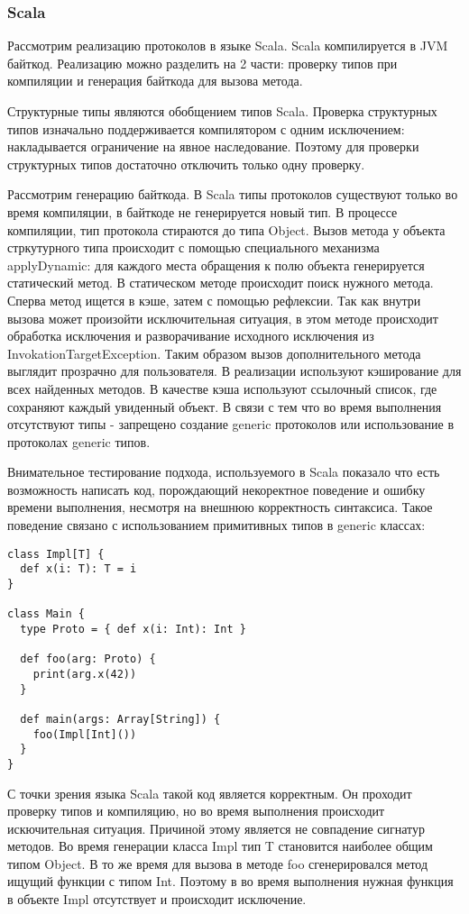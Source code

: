 \subsubsection{Scala}
Рассмотрим реализацию протоколов в языке Scala\cite{scala:structural}. Scala компилируется в JVM байткод. Реализацию можно разделить на 2 части: проверку типов при компиляции и генерация байткода для вызова метода.

Структурные типы являются обобщением типов Scala. Проверка структурных типов изначально поддерживается компилятором с одним исключением: накладывается ограничение на явное наследование. Поэтому для проверки структурных типов достаточно отключить только одну проверку.

Рассмотрим генерацию байткода. В Scala типы протоколов существуют только во время компиляции, в байткоде не генерируется новый тип. В процессе компиляции, тип протокола стираются до типа Object. Вызов метода у объекта стркутурного типа происходит с помощью специального механизма applyDynamic: для каждого места обращения к полю объекта генерируется статический метод. В статическом методе происходит поиск нужного метода. Сперва метод ищется в кэше, затем с помощью рефлексии. Так как внутри вызова может произойти исключительная ситуация, в этом методе происходит обработка исключения и разворачивание исходного исключения из InvokationTargetException. Таким образом вызов дополнительного метода выглядит прозрачно для пользователя. В реализации используют кэширование для всех найденных методов. В качестве кэша используют ссылочный список, где сохраняют каждый увиденный объект. В связи с тем что во время выполнения отсутствуют типы - запрещено создание generic протоколов или использование в протоколах generic типов.

Внимательное тестирование подхода, используемого в Scala показало что есть возможность написать код, порождающий некоректное поведение и ошибку времени выполнения, несмотря на внешнюю корректность синтаксиса. Такое поведение связано с использованием примитивных типов в generic классах:

\begin{verbatim}
class Impl[T] {
  def x(i: T): T = i
}

class Main {
  type Proto = { def x(i: Int): Int }

  def foo(arg: Proto) {
    print(arg.x(42))
  }

  def main(args: Array[String]) {
    foo(Impl[Int]())
  }
}
\end{verbatim}

С точки зрения языка Scala такой код является корректным. Он проходит проверку типов и компиляцию, но во время выполнения происходит искючительная ситуация. Причиной этому является не совпадение сигнатур методов. Во время генерации класса Impl тип T становится наиболее общим типом Object. В то же время для вызова в методе foo сгенерировался метод ищущий функции с типом Int. Поэтому в во время выполнения нужная функция в объекте Impl отсутствует и происходит исключение.
